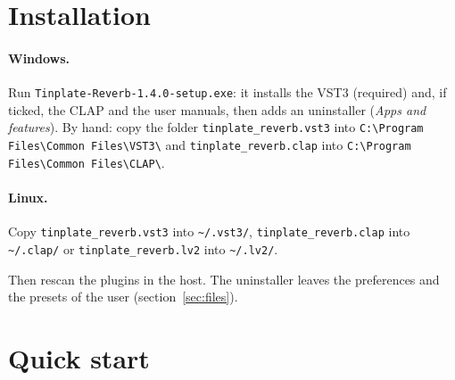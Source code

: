 \documentclass[a4paper,11pt]{article}
\begin{document}
\section{Installation}

\paragraph{Windows.} Run \texttt{Tinplate-Reverb-1.4.0-setup.exe}: it installs the VST3
(required) and, if ticked, the CLAP and the user manuals, then adds an uninstaller (\emph{Apps
and features}). By hand: copy the folder \texttt{tinplate\_reverb.vst3} into
\verb|C:\Program Files\Common Files\VST3\| and \texttt{tinplate\_reverb.clap} into
\verb|C:\Program Files\Common Files\CLAP\|.

\paragraph{Linux.} Copy \texttt{tinplate\_reverb.vst3} into \verb|~/.vst3/|,
\texttt{tinplate\_reverb.clap} into \verb|~/.clap/| or \texttt{tinplate\_reverb.lv2} into
\verb|~/.lv2/|.

Then rescan the plugins in the host. The uninstaller leaves the preferences and the presets of
the user (section~\ref{sec:files}).

\section{Quick start}
\end{document}
